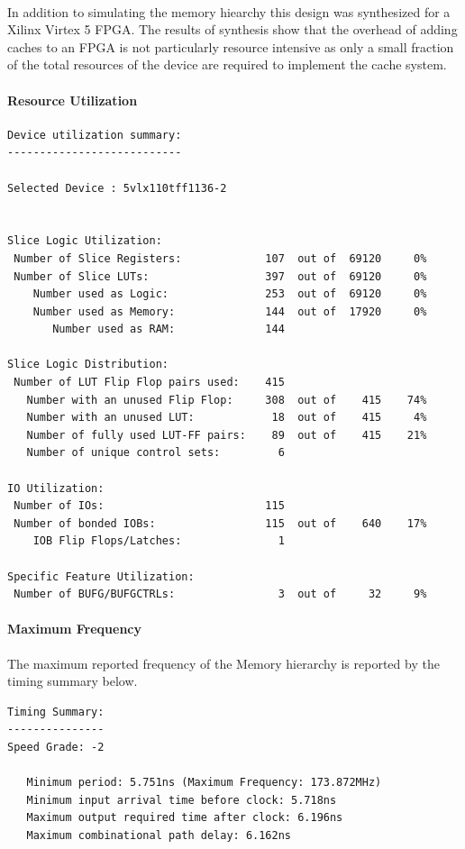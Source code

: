 \documentclass[11pt,letterpaper,]{article}
\begin{document}
\paragraph{}
In addition to simulating the memory hiearchy this design was synthesized for a Xilinx Virtex 5 FPGA.  The results of synthesis show that the overhead of adding caches to an FPGA is not particularly resource intensive as only a small fraction of the total resources of the device are required to implement the cache system.
\paragraph{ Resource Utilization }

\begin{verbatim}
Device utilization summary:
---------------------------

Selected Device : 5vlx110tff1136-2 


Slice Logic Utilization: 
 Number of Slice Registers:             107  out of  69120     0%  
 Number of Slice LUTs:                  397  out of  69120     0%  
    Number used as Logic:               253  out of  69120     0%  
    Number used as Memory:              144  out of  17920     0%  
       Number used as RAM:              144

Slice Logic Distribution: 
 Number of LUT Flip Flop pairs used:    415
   Number with an unused Flip Flop:     308  out of    415    74%  
   Number with an unused LUT:            18  out of    415     4%  
   Number of fully used LUT-FF pairs:    89  out of    415    21%  
   Number of unique control sets:         6

IO Utilization: 
 Number of IOs:                         115
 Number of bonded IOBs:                 115  out of    640    17%  
    IOB Flip Flops/Latches:               1

Specific Feature Utilization:
 Number of BUFG/BUFGCTRLs:                3  out of     32     9%  
\end{verbatim}

\paragraph{ Maximum Frequency }
The maximum reported frequency of the Memory hierarchy is reported by the timing summary below.

\begin{verbatim}
Timing Summary:
---------------
Speed Grade: -2

   Minimum period: 5.751ns (Maximum Frequency: 173.872MHz)
   Minimum input arrival time before clock: 5.718ns
   Maximum output required time after clock: 6.196ns
   Maximum combinational path delay: 6.162ns
\end{verbatim}
\end{document}
